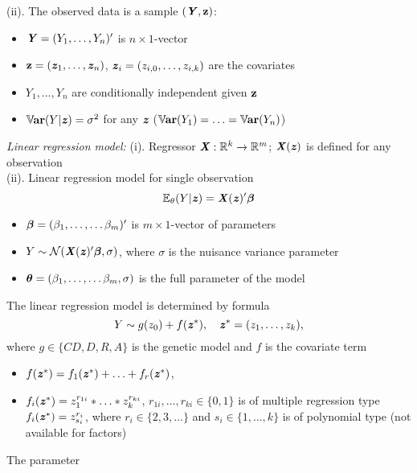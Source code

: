 \documentclass[11pt]{article}
\begin{document}
\noindent
(ii). The observed data is a sample $(\mbox{\textbf{\textit Y}},\mbox{\bf z})$:\vspace{-2mm}
\begin{itemize}
\setlength\itemsep{-0.5em}
\item[]
$\mbox{\textbf{\textit Y}}=(Y_1,\ldots,Y_n)'$ is $n\times 1$-vector
\item[]
$\mbox{\bf z}=(\mbox{\textbf{\textit z}}_1,\ldots,\mbox{\textbf{\textit z}}_n)$, $\mbox{\textbf{\textit z}}_{i}=(z_{i,0},\ldots,z_{i,k})$  are the covariates
\item[]
$Y_1,\ldots,Y_n$ are conditionally independent given $\mbox{\bf z}$
\item[]
${\mathbb V}\hspace{-0.2ex}\mbox{\bf ar}(Y|\mbox{\textbf{\textit z}})=\sigma^2$ for any $\mbox{\textbf{\textit z}}$ (${\mathbb V}\hspace{-0.2ex}\mbox{\bf ar}(Y_1)=\ldots ={\mathbb V}\hspace{-0.2ex}\mbox{\bf ar}(Y_n)$)
\end{itemize}
\noindent
{\it Linear regression model:} (i). Regressor $\mbox{\textbf{\textit X}}:{\mathbb R}^k\to{\mathbb R}^m$; $\mbox{\textbf{\textit X}}(\mbox{\textbf{\textit z}})$ is defined for any observation \\
(ii). Linear regression model for single observation 
$$
\E_{\theta}(Y|\zbi)=\Xbi(\zbi)'\betab
\vspace{-3mm}
$$
\begin{itemize}
\setlength\itemsep{-0.3em}
\item[]
${\boldsymbol \beta}=(\beta_1,\ldots,\ldots\beta_m)'$ is $m\times 1$-vector of parameters
\item[]
$Y\sim {\cal N}(\mbox{\textbf{\textit X}}(\mbox{\textbf{\textit z}})'{\boldsymbol \beta},\sigma)$, where $\sigma$ is the nuisance variance parameter 
\item[]
${\boldsymbol \theta}=(\beta_1,\ldots,\ldots\beta_m,\sigma)$ is the full parameter of the model
\end{itemize}
The linear regression model is determined by formula 
$$
Y\sim g(z_0)+f(\zbi^*),\quad \zbi^*=(z_1,\ldots,z_k),
\vspace{-2mm}
$$
where $g\in \{CD,D,R,A\}$ is the genetic model and $f$ is the covariate term
\vspace{-2mm}
\begin{itemize}
\setlength\itemsep{-0.3em}
\item[]
$f(\mbox{\textbf{\textit z}}^*)=f_1(\mbox{\textbf{\textit z}}^*)+\ldots+f_r(\mbox{\textbf{\textit z}}^*)$, 
\item[]
$f_i(\mbox{\textbf{\textit z}}^*)=z_1^{r_{1i}}*\ldots*z_k^{r_{ki}}$, $r_{1i},\ldots,r_{ki}\in\{0,1\}$ is of multiple regression type \\
$f_i(\mbox{\textbf{\textit z}}^*)=z_{s_i}^{r_i}$, where $r_i\in \{2,3,\ldots\}$ and $s_i\in\{1,\ldots,k\}$ is of polynomial type (not available for factors)
\end{itemize}
The parameter\vspace{-2mm}
\end{document}
